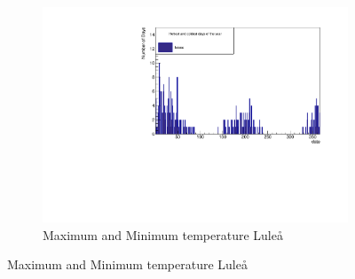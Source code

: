 \documentclass[aps,prl,groupedaddress,twocolumn]{revtex4-1}
\begin{document}
\begin{figure}[h!]
    \begin{subfigure}{0.45\textwidth}
            \includegraphics[width=\textwidth,trim= 0 0 0 0.6cm,clip]{MinMaxLuleaa.pdf}
            \vspace{-0.6cm}
            \caption{Maximum and Minimum temperature Luleå}
            \label{fig:MinMaxLuleå}
    \end{subfigure}
    

\end{figure}
\end{document}

